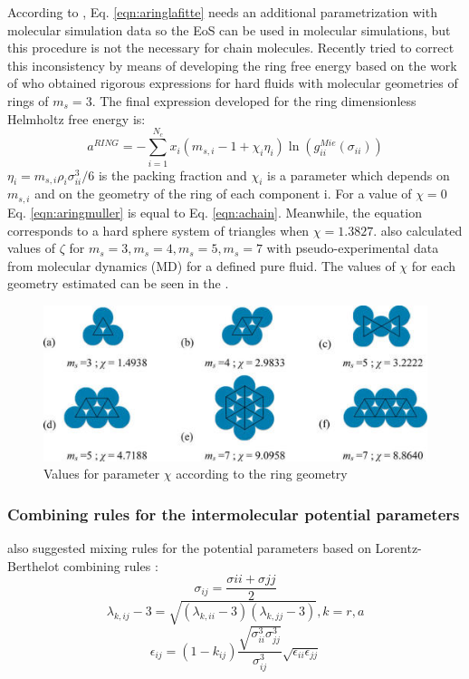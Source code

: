According to , Eq. \eqref{eqn:aringlafitte} needs an additional parametrization with molecular simulation data so the EoS can  be used in molecular simulations, but this procedure is not the necessary for chain molecules. Recently  tried to correct this inconsistency by means of developing the ring free energy based on the work of  who obtained rigorous expressions for hard fluids with molecular geometries of rings of $m_s=3$. The final expression developed for the ring dimensionless Helmholtz free energy is:
\begin{equation}
a^{RING} =-\sum_{i=1}^{N_{c}} x_{i}(m_{s,i}-1+\chi_{i}\eta_{i})\ln(g_{ii}^{Mie}(\sigma_{ii}))
\label{eqn:aringmuller}
\end{equation}
$\eta_{i}=m_{s,i}\rho_{i}\sigma_{ii}^{3}/6$ is the packing fraction and $\chi_{i}$ is a parameter which depends on $m_{s,i}$ and on the geometry of the ring of each component i. For a value of $\chi=0$ Eq. \eqref{eqn:aringmuller} is equal to Eq. \eqref{eqn:achain}. Meanwhile, the equation corresponds to a hard sphere system of triangles when $\chi=1.3827$.  also calculated values of $\zeta$ for $m_{s}=3,m_{s}=4,m_{s}=5,m_{s}=7$ with pseudo-experimental data from molecular dynamics (MD) for a defined pure fluid. The values of $\chi$ for each geometry estimated can be seen in the .
\begin{figure}[th]
\centering
\includegraphics[scale=0.8]{Figures/mullergeo.jpg}
\caption{Values for parameter $\chi$ according to the ring geometry \cite{muller2017}}
\label{ringqsi}
\end{figure}

\subsubsection{Combining rules for the intermolecular potential parameters}
 also suggested mixing rules for the potential parameters based on Lorentz-Berthelot combining rules \cite{rowlinson}:
\begin{equation}
\sigma_{ij} =\frac{\sigma{ii}+\sigma{jj}}{2}
\label{eqn:sigmamix}
\end{equation}
\begin{equation}
\lambda_{k,ij} -3 =\sqrt{(\lambda_{k,ii}-3)(\lambda_{k,jj}-3)} , k=r,a
\label{eqn:lambdamix}
\end{equation}
\begin{equation}
\epsilon_{ij} =(1-k_{ij})\frac{\sqrt{\sigma_{ii}^{3}\sigma_{jj}^{3}}}{\sigma_{ij}^{3}}\sqrt{\epsilon_{ii}\epsilon_{jj}}
\label{eqn:epsmix}
\end{equation}

